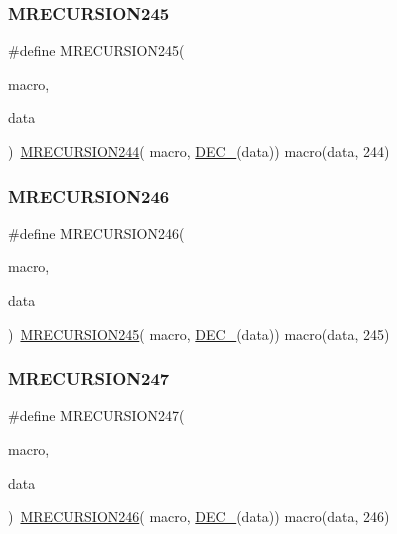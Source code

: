 \subsubsection{\texorpdfstring{MRECURSION245}{MRECURSION245}}
{\footnotesize\ttfamily \#define M\+R\+E\+C\+U\+R\+S\+I\+O\+N245(\begin{DoxyParamCaption}\item[{}]{macro,  }\item[{}]{data }\end{DoxyParamCaption})~\mbox{\hyperlink{group__group__sam0__utils__mrecursion_gac3825130b40518fcd95815a474335cfa}{M\+R\+E\+C\+U\+R\+S\+I\+O\+N244}}(  macro, \mbox{\hyperlink{group__group__sam0__utils__mrecursion_ga1d23d683797679dca8c3512a54a5dcae}{D\+E\+C\+\_\+}}(data))   macro(data, 244)}

\mbox{\label{group__group__sam0__utils__mrecursion_ga25546469a624b95c6a35ac8afc6f8639}} 
\subsubsection{\texorpdfstring{MRECURSION246}{MRECURSION246}}
{\footnotesize\ttfamily \#define M\+R\+E\+C\+U\+R\+S\+I\+O\+N246(\begin{DoxyParamCaption}\item[{}]{macro,  }\item[{}]{data }\end{DoxyParamCaption})~\mbox{\hyperlink{group__group__sam0__utils__mrecursion_ga29389831061b5516c92aecda3fa98385}{M\+R\+E\+C\+U\+R\+S\+I\+O\+N245}}(  macro, \mbox{\hyperlink{group__group__sam0__utils__mrecursion_ga1d23d683797679dca8c3512a54a5dcae}{D\+E\+C\+\_\+}}(data))   macro(data, 245)}

\mbox{\label{group__group__sam0__utils__mrecursion_gabf0b381254bd692cd7d2a3099bb3b9c0}} 
\subsubsection{\texorpdfstring{MRECURSION247}{MRECURSION247}}
{\footnotesize\ttfamily \#define M\+R\+E\+C\+U\+R\+S\+I\+O\+N247(\begin{DoxyParamCaption}\item[{}]{macro,  }\item[{}]{data }\end{DoxyParamCaption})~\mbox{\hyperlink{group__group__sam0__utils__mrecursion_ga25546469a624b95c6a35ac8afc6f8639}{M\+R\+E\+C\+U\+R\+S\+I\+O\+N246}}(  macro, \mbox{\hyperlink{group__group__sam0__utils__mrecursion_ga1d23d683797679dca8c3512a54a5dcae}{D\+E\+C\+\_\+}}(data))   macro(data, 246)}

